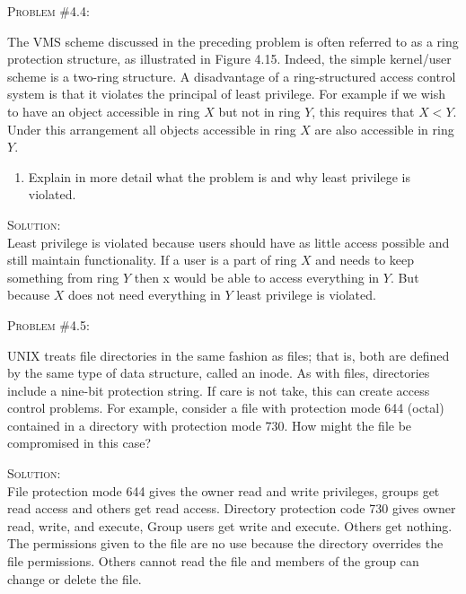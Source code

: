 \documentclass[12pt]{article}
\newenvironment{problem}[1]
{\begin{mdframed}[linewidth=0.8pt]
        \textsc{Problem #1:}

}
    {\end{mdframed}}
\newenvironment{solution}
    {\textsc{Solution:}\\}
    {\newpage}%
\begin{document}
	\begin{problem}{\#4.4}
		The VMS scheme discussed in the preceding problem is often referred to as a ring
		protection structure, as illustrated in Figure 4.15. Indeed, the simple kernel/user
		scheme is a two-ring structure. A disadvantage of a ring-structured access control
		system is that it violates the principal of least privilege. For example if we wish
		to have an object accessible in ring $X$ but not in ring $Y$, this requires that
		$X < Y$. Under this arrangement all objects accessible in ring $X$ are also accessible
		in ring $Y$.
		\begin{enumerate}[label=\alph*]
			\item Explain in more detail what the problem is and why least privilege is
				violated.
		\end{enumerate}
	\end{problem}
	\begin{solution}
		Least privilege is violated because users should have as little access possible and
		still maintain functionality. If a user is a part of ring $X$ and needs to keep
		something from ring  $Y$ then x would be able to access everything in  $Y$. But
		because  $X$ does not need everything in  $Y$ least privilege is violated.
	\end{solution}

	\begin{problem}{\#4.5}
		UNIX treats file directories in the same fashion as files; that is, both are defined
		by the same type of data structure, called an inode. As with files, directories 
		include a nine-bit protection string. If care is not take, this can create access
		control problems. For example, consider a file with protection mode 644 (octal)
		contained in a directory with protection mode 730. How might the file be compromised
		in this case?
	\end{problem}
	\begin{solution}
		File protection mode 644 gives the owner read and write privileges, groups get read access
		and  others get read access. Directory protection code 730 gives owner read, write,
		and execute, Group users get write and execute. Others get nothing.\\

		The permissions given to the file are no use because the directory overrides the
		file permissions. Others cannot read the file and members of the group can change or delete
		the file.
	\end{solution}
\end{document}
